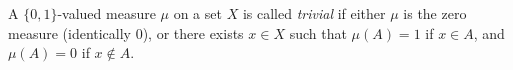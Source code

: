 A $\{0,1\}$-valued measure $\mu$ on a set $X$ is called \emph{trivial} if either $\mu$ is the zero measure (identically $0$), or there exists $x \in X$ such that $\mu(A) = 1$ if $x \in A$, and $\mu(A) = 0$ if $x \notin A$.